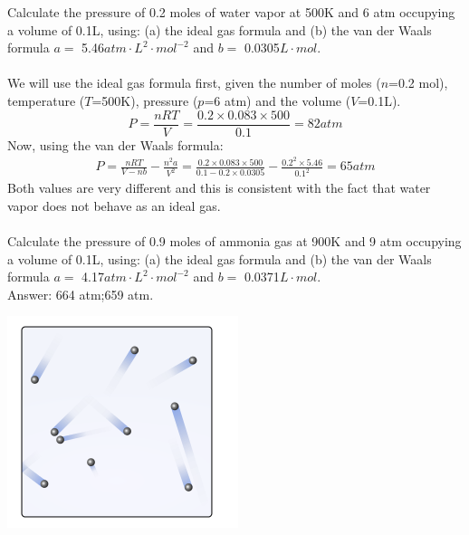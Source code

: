 \documentclass[main.tex]{subfiles}
\begin{document}
\begin{description}
\begin{example} %
Calculate the pressure of 0.2 moles of water vapor at 500K and 6 atm occupying a volume of 0.1L, using: (a) the ideal gas formula and (b) the van der Waals formula $a=$ 5.46$ atm\cdot L^2\cdot mol^{-2}$ and $b=$ 0.0305$L\cdot mol$.\\
\\
We will use the ideal gas formula first, given the number of moles ($n$=0.2 mol), temperature ($T$=500K), pressure ($p$=6 atm) and the volume ($V$=0.1L).
\begin{equation*}
P=\frac{nRT}{V}=\frac{0.2\times 0.083\times 500}{0.1}=82atm   
\end{equation*}
Now, using the van der Waals formula:
\begin{equation*}\begin{split}
P=\frac{nRT}{V-nb}-\frac{n^2a}{V^2}= \frac{0.2\times 0.083\times 500}{0.1-0.2\times 0.0305}-\frac{0.2^2\times 5.46}{0.1^2}=65atm 
\end{split}\end{equation*}
Both values are very different and this is consistent with the fact that water vapor does not behave as an ideal gas.
\\
\faDiamond\ \\
Calculate the pressure of 0.9 moles of ammonia gas at 900K and 9 atm occupying a volume of 0.1L, using: (a) the ideal gas formula and (b) the van der Waals formula $a=$ 4.17$ atm\cdot L^2\cdot mol^{-2}$ and $b=$ 0.0371$L\cdot mol$.\\
\flushright Answer: 664 atm;659 atm.
\end{example}%
\item[\docfilehook{Kinetic theory of gases}{Kinetic theory of gases}] 
\begin{marginfigure}[0cm]%
\includegraphics{chapter8/figure3}

\end{marginfigure}
\end{description}
\end{document}
